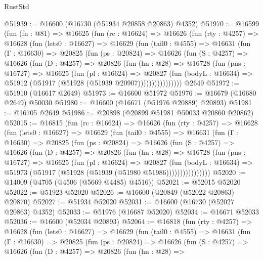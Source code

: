 \begin{lexlean}{RustStd}
\begin{coremodule}
@51939 := @16600 (@16730 (@51934 @20858 @20863) @4352)
@51970 := @16599
    (fun (fn : @81) =>
    @16625
      (fun (rc : @16624) =>
      @16626
        (fun (rty : @4257) =>
        @16628
          (fun (lets0 : @16627) =>
          @16629
            (fun (tail0 : @4555) =>
            @16631
              (fun (Γ : @16630) =>
              @20825
                (fun (ps : @20824) =>
                @16626
                  (fun (S : @4257) =>
                  @16626
                    (fun (D : @4257) =>
                    @20826
                      (fun (hn : @28) =>
                      @16728
                        (fun (pns : @16727) =>
                        @16625
                          (fun (pl : @16624) =>
                          @20827
                            (fun (bodyL : @16634) =>
                            @51912 (@51917 (@51928 (@51939 @20907))))))))))))))))
    @2649
@51972 := @51910 (@16617 @2649)
@51973 := @16600 @51972
@51976 := @16679 (@16680 @2649) @50030
@51980 := @16600 (@16671 (@51976 @20889) @20893)
@51981 := @16705 @2649
@51986 := @20898 (@20899 @51981 @50033 @20860 @20862)
@52015 := @16815
    (fun (rc : @16624) =>
    @16626
      (fun (rty : @4257) =>
      @16628
        (fun (lets0 : @16627) =>
        @16629
          (fun (tail0 : @4555) =>
          @16631
            (fun (Γ : @16630) =>
            @20825
              (fun (ps : @20824) =>
              @16626
                (fun (S : @4257) =>
                @16626
                  (fun (D : @4257) =>
                  @20826
                    (fun (hn : @28) =>
                    @16728
                      (fun (pns : @16727) =>
                      @16625
                        (fun (pl : @16624) =>
                        @20827
                          (fun (bodyL : @16634) =>
                          @51973 (@51917 (@51928 (@51939 (@51980 @51986))))))))))))))))
@52020 := @14009 (@4705 (@4506 (@5669 @4485) @4516))
@52021 := @52015 @52020
@52022 := @51923 @52020
@52026 := @16600 (@20849 (@52022 @20863) @20870)
@52027 := @51934 @52020
@52031 := @16600 (@16730 (@52027 @20863) @4352)
@52033 := @51976 (@16687 @52020)
@52034 := @16671 @52033
@52036 := @16600 (@52034 @20893)
@52064 := @16818
    (fun (rty : @4257) =>
    @16628
      (fun (lets0 : @16627) =>
      @16629
        (fun (tail0 : @4555) =>
        @16631
          (fun (Γ : @16630) =>
          @20825
            (fun (ps : @20824) =>
            @16626
              (fun (S : @4257) =>
              @16626
                (fun (D : @4257) =>
                @20826
                  (fun (hn : @28) =>

\end{coremodule}
\end{lexlean}
